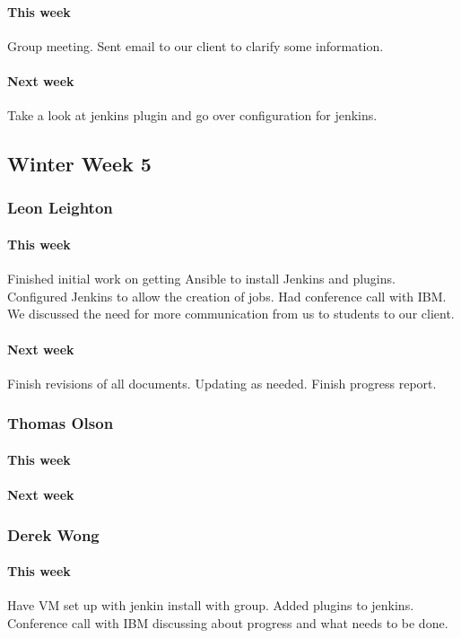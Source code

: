 \documentclass[10pt,letterpaper,onecolumn,draftclsnofoot]{IEEEtran}
\begin{document}
\paragraph{This week}Group meeting.    
Sent email to our client to clarify some information.
\paragraph{Next week}Take a look at jenkins plugin and go over configuration for jenkins.


\subsection{Winter Week 5}
\subsubsection{Leon Leighton}
\paragraph{This week}Finished initial work on getting Ansible to install Jenkins and plugins.  
Configured Jenkins to allow the creation of jobs.  
Had conference call with IBM. We discussed the need for more communication from us to students to our client.
\paragraph{Next week}Finish revisions of all documents. Updating as needed.  
Finish progress report.


\subsubsection{Thomas Olson}
\paragraph{This week}
\paragraph{Next week}


\subsubsection{Derek Wong}
\paragraph{This week}Have VM set up with jenkin install with group.       
Added plugins to jenkins.      
Conference call with IBM discussing about progress and what needs to be done. 
\end{document}

